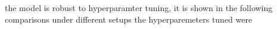         the model is robust to hyperparamter tuning, it is shown in the following comparisons under different setups 
        the hyperparemeters tuned were

    


        
        
        
    
    
    
